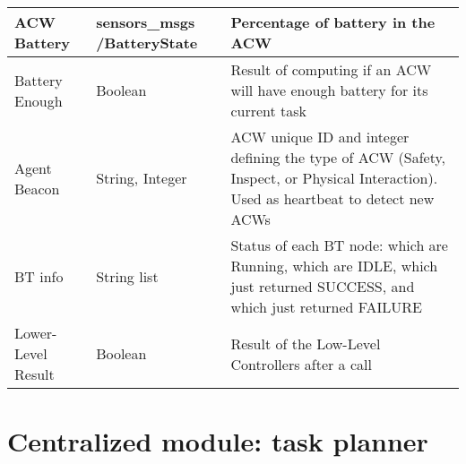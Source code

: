 \begin{table}[htb]
\begin{tabular}{|p{}|p{}|p{}|}
      \gls{ACW} Battery & sensors\_msgs /BatteryState & Percentage of battery in the \gls{ACW}\\ \hline
      
      Battery Enough & Boolean & Result of computing if an \gls{ACW} will have enough battery for its current task \\ \hline
      
      Agent Beacon & String, Integer & \gls{ACW} unique ID and integer defining the type of \gls{ACW} (Safety, Inspect, or Physical Interaction). Used as heartbeat to detect new \glspl{ACW} \\ \hline
      
      \gls{BT} info & String list & Status of each \gls{BT} node: which are Running, which are IDLE, which just returned SUCCESS, and which just returned FAILURE \\ \hline
      
      Lower-Level Result & Boolean & Result of the Low-Level Controllers after a call \\ \hline
      
    \end{tabular}
\end{table}

\section{Centralized module: task planner}
\label{sec:Centralized module:TaskPlanner}


